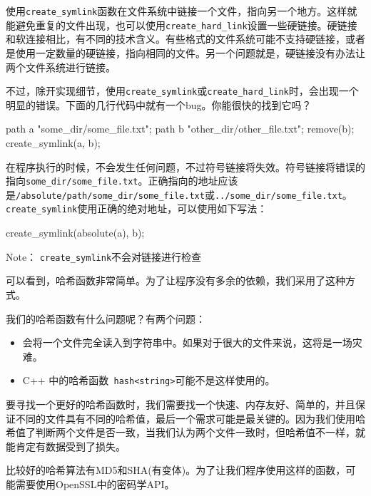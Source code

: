 
使用\texttt{create\_symlink}函数在文件系统中链接一个文件，指向另一个地方。这样就能避免重复的文件出现，也可以使用\texttt{create\_hard\_link}设置一些硬链接。硬链接和软连接相比，有不同的技术含义。有些格式的文件系统可能不支持硬链接，或者是使用一定数量的硬链接，指向相同的文件。另一个问题就是，硬链接没有办法让两个文件系统进行链接。

不过，除开实现细节，使用\texttt{create\_symlink}或\texttt{create\_hard\_link}时，会出现一个明显的错误。下面的几行代码中就有一个bug。你能很快的找到它吗？

\begin{codebox}[cpp]
path a {"some_dir/some_file.txt"};
path b {"other_dir/other_file.txt"};
remove(b);
create_symlink(a, b);
\end{codebox}

在程序执行的时候，不会发生任何问题，不过符号链接将失效。符号链接将错误的指向\texttt{some\_dir/some\_file.txt}。正确指向的地址应该是\texttt{/absolute/path/some\_dir/some\_file.txt}或\texttt{../some\_dir/some\_file.txt}。\texttt{create\_symlink}使用正确的绝对地址，可以使用如下写法：

\begin{codebox}[cpp]
create_symlink(absolute(a), b);
\end{codebox}

\begin{myInfoBox}
Note： \texttt{create\_symlink}不会对链接进行检查
\end{myInfoBox}


可以看到，哈希函数非常简单。为了让程序没有多余的依赖，我们采用了这种方式。

我们的哈希函数有什么问题呢？有两个问题：

\begin{itemize}
\item 会将一个文件完全读入到字符串中。如果对于很大的文件来说，这将是一场灾难。

\item C++ 中的哈希函数\texttt{ hash<string>}可能不是这样使用的。

\end{itemize}

要寻找一个更好的哈希函数时，我们需要找一个快速、内存友好、简单的，并且保证不同的文件具有不同的哈希值，最后一个需求可能是最关键的。因为我们使用哈希值了判断两个文件是否一致，当我们认为两个文件一致时，但哈希值不一样，就能肯定有数据受到了损失。

比较好的哈希算法有MD5和SHA(有变体)。为了让我们程序使用这样的函数，可能需要使用OpenSSL中的密码学API。


